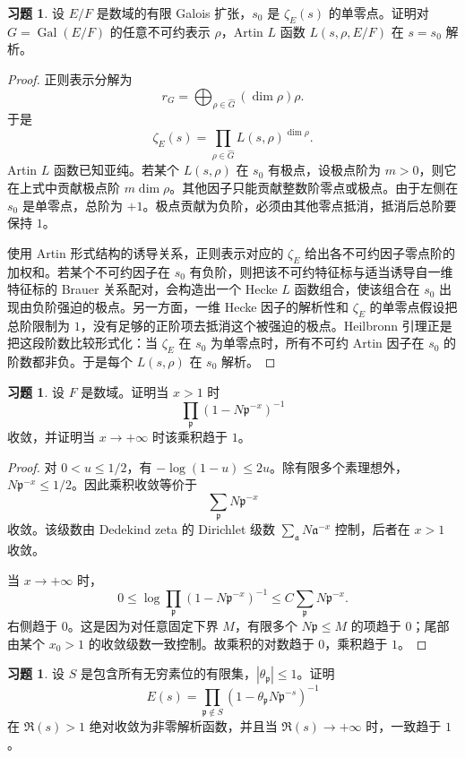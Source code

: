\documentclass[11pt,a4paper,openany]{ctexbook}
\numberwithin{equation}{chapter}
\newcommand{\Gal}{\operatorname{Gal}}
\theoremstyle{plain}
\theoremstyle{definition}
\newtheorem{exercise}[theorem]{习题}
\theoremstyle{remark}
\begin{document}
\begin{exercise}
设 $E/F$ 是数域的有限 Galois 扩张，$s_0$ 是 $\zeta_E(s)$ 的单零点。证明对 $G=\Gal(E/F)$ 的任意不可约表示 $\rho$，Artin $L$ 函数 $L(s,\rho,E/F)$ 在 $s=s_0$ 解析。
\end{exercise}

\begin{proof}
正则表示分解为
\[
  r_G=\bigoplus_{\rho\in\widehat G}(\dim\rho)\rho.
\]
于是
\[
  \zeta_E(s)=\prod_{\rho\in\widehat G}L(s,\rho)^{\dim\rho}.
\]
Artin $L$ 函数已知亚纯。若某个 $L(s,\rho)$ 在 $s_0$ 有极点，设极点阶为 $m>0$，则它在上式中贡献极点阶 $m\dim\rho$。其他因子只能贡献整数阶零点或极点。由于左侧在 $s_0$ 是单零点，总阶为 $+1$。极点贡献为负阶，必须由其他零点抵消，抵消后总阶要保持 $1$。

使用 Artin 形式结构的诱导关系，正则表示对应的 $\zeta_E$ 给出各不可约因子零点阶的加权和。若某个不可约因子在 $s_0$ 有负阶，则把该不可约特征标与适当诱导自一维特征标的 Brauer 关系配对，会构造出一个 Hecke $L$ 函数组合，使该组合在 $s_0$ 出现由负阶强迫的极点。另一方面，一维 Hecke 因子的解析性和 $\zeta_E$ 的单零点假设把总阶限制为 $1$，没有足够的正阶项去抵消这个被强迫的极点。Heilbronn 引理正是把这段阶数比较形式化：当 $\zeta_E$ 在 $s_0$ 为单零点时，所有不可约 Artin 因子在 $s_0$ 的阶数都非负。于是每个 $L(s,\rho)$ 在 $s_0$ 解析。
\end{proof}

\begin{exercise}
设 $F$ 是数域。证明当 $x>1$ 时
\[
  \prod_{\mathfrak p}(1-N\mathfrak p^{-x})^{-1}
\]
收敛，并证明当 $x\to+\infty$ 时该乘积趋于 $1$。
\end{exercise}

\begin{proof}
对 $0<u\le1/2$，有 $-\log(1-u)\le2u$。除有限多个素理想外，$N\mathfrak p^{-x}\le1/2$。因此乘积收敛等价于
\[
  \sum_{\mathfrak p}N\mathfrak p^{-x}
\]
收敛。该级数由 Dedekind zeta 的 Dirichlet 级数 $\sum_{\mathfrak a}N\mathfrak a^{-x}$ 控制，后者在 $x>1$ 收敛。

当 $x\to+\infty$ 时，
\[
  0\le \log\prod_{\mathfrak p}(1-N\mathfrak p^{-x})^{-1}
  \le
  C\sum_{\mathfrak p}N\mathfrak p^{-x}.
\]
右侧趋于 $0$。这是因为对任意固定下界 $M$，有限多个 $N\mathfrak p\le M$ 的项趋于 $0$；尾部由某个 $x_0>1$ 的收敛级数一致控制。故乘积的对数趋于 $0$，乘积趋于 $1$。
\end{proof}

\begin{exercise}
设 $S$ 是包含所有无穷素位的有限集，$|\theta_{\mathfrak p}|\le1$。证明
\[
  E(s)=\prod_{\mathfrak p\notin S}(1-\theta_{\mathfrak p}N\mathfrak p^{-s})^{-1}
\]
在 $\Re(s)>1$ 绝对收敛为非零解析函数，并且当 $\Re(s)\to+\infty$ 时，一致趋于 $1$。
\end{exercise}
\end{document}
